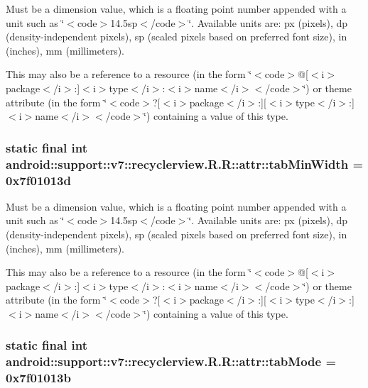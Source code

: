 Must be a dimension value, which is a floating point number appended with a unit such as \char`\"{}$<$code$>$14.5sp$<$/code$>$\char`\"{}. Available units are: px (pixels), dp (density-independent pixels), sp (scaled pixels based on preferred font size), in (inches), mm (millimeters). 

This may also be a reference to a resource (in the form \char`\"{}$<$code$>$@\mbox{[}$<$i$>$package$<$/i$>$:\mbox{]}$<$i$>$type$<$/i$>$:$<$i$>$name$<$/i$>$$<$/code$>$\char`\"{}) or theme attribute (in the form \char`\"{}$<$code$>$?\mbox{[}$<$i$>$package$<$/i$>$:\mbox{]}\mbox{[}$<$i$>$type$<$/i$>$:\mbox{]}$<$i$>$name$<$/i$>$$<$/code$>$\char`\"{}) containing a value of this type. \hypertarget{classandroid_1_1support_1_1v7_1_1recyclerview_1_1_r_1_1attr_46b3203d59b034a29d952bda5c074eec}{
\subsubsection[{tabMinWidth}]{\setlength{\rightskip}{0pt plus 5cm}static final int android::support::v7::recyclerview.R.R::attr::tabMinWidth = 0x7f01013d}}
\label{classandroid_1_1support_1_1v7_1_1recyclerview_1_1_r_1_1attr_46b3203d59b034a29d952bda5c074eec}


Must be a dimension value, which is a floating point number appended with a unit such as \char`\"{}$<$code$>$14.5sp$<$/code$>$\char`\"{}. Available units are: px (pixels), dp (density-independent pixels), sp (scaled pixels based on preferred font size), in (inches), mm (millimeters). 

This may also be a reference to a resource (in the form \char`\"{}$<$code$>$@\mbox{[}$<$i$>$package$<$/i$>$:\mbox{]}$<$i$>$type$<$/i$>$:$<$i$>$name$<$/i$>$$<$/code$>$\char`\"{}) or theme attribute (in the form \char`\"{}$<$code$>$?\mbox{[}$<$i$>$package$<$/i$>$:\mbox{]}\mbox{[}$<$i$>$type$<$/i$>$:\mbox{]}$<$i$>$name$<$/i$>$$<$/code$>$\char`\"{}) containing a value of this type. \hypertarget{classandroid_1_1support_1_1v7_1_1recyclerview_1_1_r_1_1attr_589866805565b8ad7265fbb0e7b3f59b}{
\subsubsection[{tabMode}]{\setlength{\rightskip}{0pt plus 5cm}static final int android::support::v7::recyclerview.R.R::attr::tabMode = 0x7f01013b}}
\label{classandroid_1_1support_1_1v7_1_1recyclerview_1_1_r_1_1attr_589866805565b8ad7265fbb0e7b3f59b}


